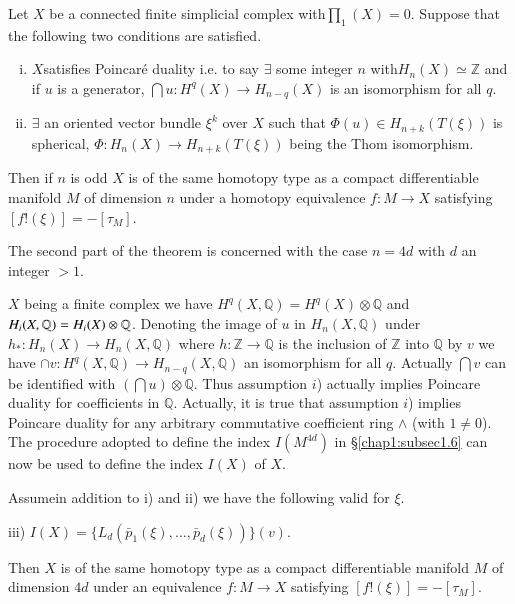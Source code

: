  \begin{theorem}\label{chap1:thm2.1}%
Let $X$ be a connected finite simplicial complex with\break $\prod_1
(X) = 0$. Suppose that the following two conditions are satisfied.  
  \begin{enumerate}[i)]
 \item $X$\pageoriginale satisfies Poincar\'e duality i.e. to say
   $\exists$  some 
   integer $n$ with\break $H_n(X)\simeq \mathbb{Z}$ and if $u$ is a
   generator, $\bigcap u : H^q (X) \to H_{n-q} (X)$ is an isomorphism
   for all $q$. 
 
 \item $\exists$ an oriented vector bundle $\xi^k$ over $X$ such that
   $\Phi (u) \in H_{n+k} (T (\xi))$ is spherical, $\Phi: H_n (X) \to
   H_{n+k} (T(\xi))$ being the Thom isomorphism. 
  \end{enumerate}  
 \end{theorem}

  Then if $n$ is odd $X$ is of the same homotopy type as a compact
  differentiable manifold $M$ of dimension $n$ under a homotopy
  equivalence $f: M\to X$ satisfying $[f ! (\xi)] = - [\tau_M]$. 
  
  The second part of the theorem is concerned with the case $n
  =4d$ with $d$ an integer $> 1$.  
  
  $X$ being a finite complex we have $H^q (X, \mathbb{Q})=H^{q}(X)
  \otimes \mathbb{Q}$ and $H_{i}(X,\break \mathbb{Q}) =H_{i}(X) \otimes
  \mathbb{Q}$. Denoting the image of $u$ in $H_{n}(X, \mathbb{Q})$
  under $h_{*}: H_{n}(X) \to H_{n}(X, \mathbb{Q})$ where
  $h:\mathbb{Z}\to \mathbb{Q}$ is the inclusion of $\mathbb{Z}$ into
  $\mathbb{Q}$ by $v$ we have $\cap v : H^{q}(X, \mathbb{Q})\to
  H_{n-q}(X, \mathbb{Q})$ an isomorphism for all $q$. Actually $\bigcap
  v$ can be identified with $(\bigcap u )\otimes \mathbb{Q}$. Thus
  assumption $i$) actually implies Poincare duality for coefficients
  in $\mathbb{Q}$. Actually, it is true that assumption $i$) implies
  Poincare duality for any arbitrary commutative coefficient ring
  $\wedge$ (with $1 \neq 0$). The procedure adopted to define the
  index $I(M^{4d})$ in \S \ref{chap1:subsec1.6} can now be used to
  define the index   $I(X)$ of $X$.   
  
Assume\pageoriginale in addition to i) and ii) we have the following
valid for $\xi$.

      iii)  $I(X) = \bigg\{ L_d (\bar{p}_1 (\xi),\ldots, \bar{p}_d (\xi)) 
  \bigg\} (v)$. 
  
  Then $X$ is of the same homotopy type as a compact differentiable
  manifold $M$ of dimension $4d$ under an equivalence $f : M \to X$
  satisfying $[f ! (\xi)] = - [\tau_M]$.  
  
